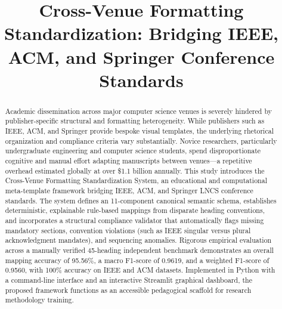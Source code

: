 \documentclass[conference]{IEEEtran}
\begin{document}
\title{Cross-Venue Formatting Standardization: Bridging IEEE, ACM, and Springer Conference Standards}

\author{
\and
{}
}

\maketitle

\begin{abstract}
Academic dissemination across major computer science venues is severely hindered by publisher-specific structural and formatting heterogeneity. While publishers such as IEEE, ACM, and Springer provide bespoke visual templates, the underlying rhetorical organization and compliance criteria vary substantially. Novice researchers, particularly undergraduate engineering and computer science students, spend disproportionate cognitive and manual effort adapting manuscripts between venues---a repetitive overhead estimated globally at over \$1.1 billion annually. This study introduces the Cross-Venue Formatting Standardization System, an educational and computational meta-template framework bridging IEEE, ACM, and Springer LNCS conference standards. The system defines an 11-component canonical semantic schema, establishes deterministic, explainable rule-based mappings from disparate heading conventions, and incorporates a structural compliance validator that automatically flags missing mandatory sections, convention violations (such as IEEE singular versus plural acknowledgment mandates), and sequencing anomalies. Rigorous empirical evaluation across a manually verified 45-heading independent benchmark demonstrates an overall mapping accuracy of 95.56\%, a macro F1-score of 0.9619, and a weighted F1-score of 0.9560, with 100\% accuracy on IEEE and ACM datasets. Implemented in Python with a command-line interface and an interactive Streamlit graphical dashboard, the proposed framework functions as an accessible pedagogical scaffold for research methodology training.
\end{abstract}
\end{document}
